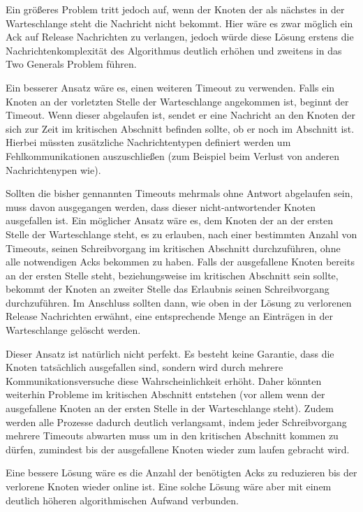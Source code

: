\documentclass[11pt,a4paper,parskip=half ]{scrartcl}
\begin{document}
	Ein größeres Problem tritt jedoch auf, wenn der Knoten der als nächstes in der Warteschlange steht die Nachricht nicht bekommt. Hier wäre es zwar möglich ein Ack auf Release Nachrichten zu verlangen, jedoch würde diese Lösung erstens die Nachrichtenkomplexität des Algorithmus deutlich erhöhen und zweitens in das Two Generals Problem führen.
	
	Ein besserer Ansatz wäre es, einen weiteren Timeout zu verwenden. Falls ein Knoten an der vorletzten Stelle der Warteschlange angekommen ist, beginnt der Timeout. Wenn dieser abgelaufen ist, sendet er eine Nachricht an den Knoten der sich zur Zeit im kritischen Abschnitt befinden sollte, ob er noch im Abschnitt ist. Hierbei müssten zusätzliche Nachrichtentypen definiert werden um Fehlkommunikationen auszuschließen (zum Beispiel beim Verlust von anderen Nachrichtenypen wie).
	
	Sollten die bisher gennannten Timeouts mehrmals ohne Antwort abgelaufen sein, muss davon ausgegangen werden, dass dieser nicht-antwortender Knoten ausgefallen ist. Ein möglicher Ansatz wäre es, dem Knoten der an der ersten Stelle der Warteschlange steht, es zu erlauben, nach einer bestimmten Anzahl von Timeouts, seinen Schreibvorgang im kritischen Abschnitt durchzuführen, ohne alle notwendigen Acks bekommen zu haben. Falls der ausgefallene Knoten bereits an der ersten Stelle steht, beziehungsweise im kritischen Abschnitt sein sollte, bekommt der Knoten an zweiter Stelle das Erlaubnis seinen Schreibvorgang durchzuführen. Im Anschluss sollten dann, wie oben in der Lösung zu verlorenen Release Nachrichten erwähnt, eine entsprechende Menge an Einträgen in der Warteschlange gelöscht werden.
	
	Dieser Ansatz ist natürlich nicht perfekt. Es besteht keine Garantie, dass die Knoten tatsächlich ausgefallen sind, sondern wird durch mehrere Kommunikationsversuche diese Wahrscheinlichkeit erhöht. Daher könnten weiterhin Probleme im kritischen Abschnitt entstehen (vor allem wenn der ausgefallene Knoten an der ersten Stelle in der Warteschlange steht). Zudem werden alle Prozesse dadurch deutlich verlangsamt, indem jeder Schreibvorgang mehrere Timeouts abwarten muss um in den kritischen Abschnitt kommen zu dürfen, zumindest bis der ausgefallene Knoten wieder zum laufen gebracht wird.
	
	Eine bessere Lösung wäre es die Anzahl der benötigten Acks zu reduzieren bis der verlorene Knoten wieder online ist. Eine solche Lösung wäre aber mit einem deutlich höheren algorithmischen Aufwand verbunden.
	
	
\end{document}
